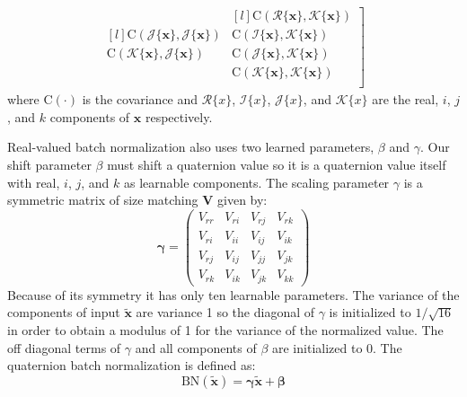 \begin{align*}
\begin{matrix*}[l]
\mbox{C}(\mathscr{J}\{\textbf{x}\}, \mathscr{J}\{\textbf{x}\}) \\
\mbox{C}(\mathscr{K}\{\textbf{x}\}, \mathscr{J}\{\textbf{x}\}) \\
\end{matrix*} \nonumber  \left.
\begin{matrix*}[l]
\mbox{C}(\mathscr{R}\{\textbf{x}\}, \mathscr{K}\{\textbf{x}\}) \\
\mbox{C}(\mathscr{I}\{\textbf{x}\}, \mathscr{K}\{\textbf{x}\}) \\
\mbox{C}(\mathscr{J}\{\textbf{x}\}, \mathscr{K}\{\textbf{x}\}) \\
\mbox{C}(\mathscr{K}\{\textbf{x}\}, \mathscr{K}\{\textbf{x}\}) \\
\end{matrix*}  \right]
\label{eq:V4d}
\end{align*}
where C$(\cdot)$ is the covariance and $\mathscr{R}\{x\}$, $\mathscr{I}\{x\}$, $\mathscr{J}\{x\}$, and $\mathscr{K}\{x\}$ are the real, $i$, $j$, and $k$ components of $\textbf{x}$ respectively.

Real-valued batch normalization also uses two learned parameters, $\beta$ and $\gamma$. 
Our shift parameter {\boldmath$\beta$} must shift a quaternion value so it is a quaternion value itself with real, $i$, $j$, and $k$ as learnable components. 
The scaling parameter {\boldmath$\gamma$} is a symmetric matrix of size matching $\textbf{V}$ given by:
\begin{equation}
\mathbf{\gamma}
=
\left( 
\begin{array}{cccc}
V_{rr} & V_{ri} & V_{rj} & V_{rk} \\
V_{ri} & V_{ii} & V_{ij} & V_{ik} \\
V_{rj} & V_{ij} & V_{jj} & V_{jk} \\
V_{rk} & V_{ik} & V_{jk} & V_{kk}
\end{array}
\right)
\label{eq:gamma}
\end{equation}
Because of its symmetry it has only ten learnable parameters. 
The variance of the components of input $\tilde{\textbf{x}}$ are variance 1 so the diagonal of {\boldmath$\gamma$} is initialized to $1/\sqrt{16}$ in order to obtain a modulus of 1 for the variance of the normalized value. 
The off diagonal terms of {\boldmath$\gamma$} and all components of {\boldmath$\beta$} are initialized to 0.
The quaternion batch normalization is defined as:
\begin{equation}
\mbox{BN}(\tilde{\textbf{x}}) = \mathbf{\gamma}\tilde{\textbf{x}} + \mathbf{\beta}
\label{eq:qbn}
\end{equation}


